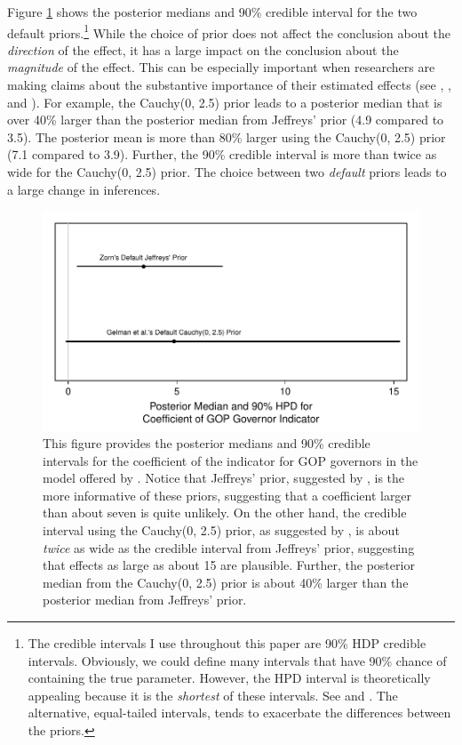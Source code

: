 \documentclass[12pt]{article}
\begin{document}
Figure \ref{fig:br-coef-illustrate-importance} shows the posterior medians and 90\% credible interval for the two default priors.\footnote{The credible intervals I use throughout this paper are 90\% HDP credible intervals. Obviously, we could define many intervals that have 90\% chance of containing the true parameter. However, the HPD interval is theoretically appealing because it is the \emph{shortest} of these intervals. See \citet[esp. pp. 48-51]{Gill2008} and \citet[esp. p. 448]{CasellaBerger2002}. The alternative, equal-tailed intervals, tends to exacerbate the differences between the priors.} While the choice of prior does not affect the conclusion about the \emph{direction} of the effect, it has a large impact on the conclusion about the \emph{magnitude} of the effect. This can be especially important when researchers are making claims about the substantive importance of their estimated effects (see \citealt{Rainey2014}, \citealt{Gross2014}, and \citealt{McCaskeyRainey2014}). For example, the Cauchy(0, 2.5) prior leads to a posterior median that is over 40\% larger than the posterior median from Jeffreys' prior (4.9 compared to 3.5). The posterior mean is more than 80\% larger using the Cauchy(0, 2.5) prior (7.1 compared to 3.9). Further, the 90\% credible interval is more than twice as wide for the Cauchy(0, 2.5) prior. The choice between two \emph{default} priors leads to a large change in inferences.

\begin{figure}[H]
\begin{center}
\includegraphics[scale = .8]{figs/br-coef-illustrate-importance.pdf}
\caption{This figure provides the posterior medians and 90\% credible intervals for the coefficient of the indicator for GOP governors in the model offered by \cite{BarrilleauxRainey2014}. Notice that Jeffreys' prior, suggested by \cite{Zorn2005}, is the more informative of these priors, suggesting that a coefficient larger than about seven is quite unlikely. On the other hand, the credible interval using the Cauchy(0, 2.5) prior, as suggested by \cite{Gelmanetal2008}, is about \emph{twice} as wide as the credible interval from Jeffreys' prior, suggesting that effects as large as about 15 are plausible. Further, the posterior median from the Cauchy(0, 2.5) prior is about 40\% larger than the posterior median from Jeffreys' prior.}\label{fig:br-coef-illustrate-importance}
\end{center}
\end{figure}
\end{document}

